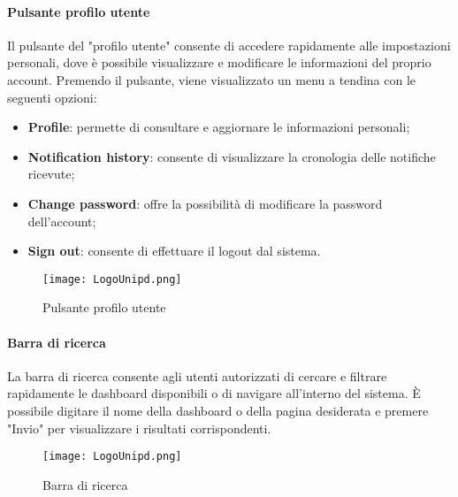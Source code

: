 \documentclass[10pt]{article}
\begin{document}
\begin{justify}
    \paragraph{Pulsante profilo utente}
    Il pulsante del "profilo utente" consente di accedere rapidamente alle impostazioni personali, dove è possibile visualizzare e modificare le informazioni del proprio account. Premendo il pulsante, viene visualizzato un menu a tendina con le seguenti opzioni:
    \begin{itemize}
        \item \textbf{Profile}: permette di consultare e aggiornare le informazioni personali;
        \item \textbf{Notification history}: consente di visualizzare la cronologia delle notifiche ricevute;
        \item \textbf{Change password}: offre la possibilità di modificare la password dell'account;
        \item \textbf{Sign out}: consente di effettuare il logout dal sistema.
    \end{itemize}
    \begin{figure}[H]
    \centering
    \texttt{[image: LogoUnipd.png]}
    \caption{Pulsante profilo utente}
    \end{figure}

    \paragraph{Barra di ricerca}
    La barra di ricerca consente agli utenti autorizzati di cercare e filtrare rapidamente le dashboard disponibili o di navigare all'interno del sistema. È possibile digitare il nome della dashboard o della pagina desiderata e premere "Invio" per visualizzare i risultati corrispondenti.
    \begin{figure}[H]
    \centering
    \texttt{[image: LogoUnipd.png]}
    \caption{Barra di ricerca}
    \end{figure}


\end{justify}
\end{document}
